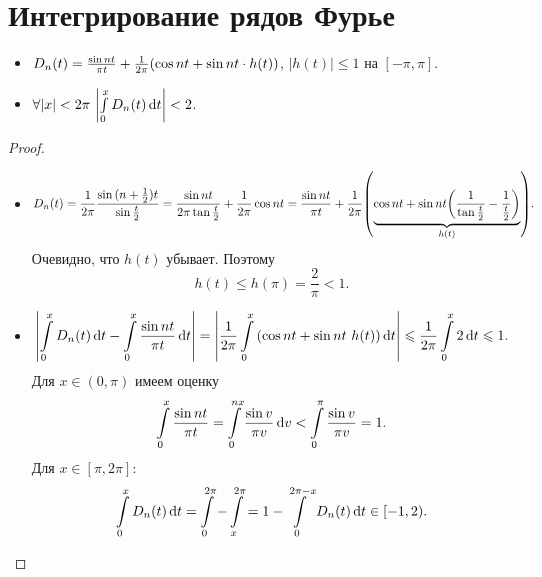 \section{Интегрирование рядов Фурье}

\begin{lemma}
    \enewline
    \begin{itemize}
        \item $D_n(t) = \frac{\sin{nt}}{\pi t} + \frac{1}{2\pi}
            \parens*{\cos{nt} + \sin{nt} \cdot h(t)}$, $|h(t)| \leqslant 1$
            на $[-\pi, \pi]$.
    \item $\forall |x| < 2\pi~ \abs*{\intl_0^x{D_n(t) \dd t}} < 2$.
    \end{itemize}
\end{lemma}
\begin{proof}
    \enewline
    \begin{itemize}
        \item \begin{align*}
                D_n(t) = \frac{1}{2\pi}\frac{\sin{(n + \frac{1}{2}) t}}{
                \sin{\frac{t}{2}}} = \frac{\sin{nt}}{2\pi \tan{\frac{t}{2}}}
                + \frac{1}{2\pi}\cos{nt} =
                \frac{\sin{nt}}{\pi t} + \frac{1}{2\pi} \parens*{\underbrace{\cos{nt} +
                        \sin{nt} \parens*{\frac{1}{\tan{\frac{t}{2}}} -
                \frac{1}{\frac{t}{2}}}}_{h(t)}}
            .\end{align*}
            Очевидно, что $h(t)$ убывает. Поэтому
            \[
                h(t) \leqslant h(\pi) = \frac{2}{\pi} < 1
            .\]
        \item \begin{align*}
                \abs*{\intl_0^x{D_n(t) \dd t} - \intl_0^x{\frac{\sin{nt}}{\pi t}
                        \dd t}} = \abs*{\frac{1}{2\pi} \intl_0^x{(\cos{nt} + \sin{nt}
                ~h(t)) \dd t}} \leqslant \frac{1}{2\pi} \intl_0^x{2 \dd t} \leqslant 1
            .\end{align*}
            Для $x \in (0, \pi)$ имеем оценку
            \begin{align*}
                \intl_0^x{\frac{\sin{nt}}{\pi t}} = \intl_0^{nx}{\frac
                {\sin{v}}{\pi v} \dd v} < \intl_0^{\pi}
                {\frac{\sin{v}}{\pi v}} = 1
            .\end{align*}
            Для $x \in [\pi, 2\pi]$:
            \begin{align*}
                \intl_0^x{D_n(t) \dd t} = \intl_0^{2\pi} - \intl_x^{2\pi} =
                1 - \intl_0^{2\pi - x}{D_n(t) \dd t} \in [-1, 2)
            .\end{align*}
    \end{itemize}
\end{proof}

